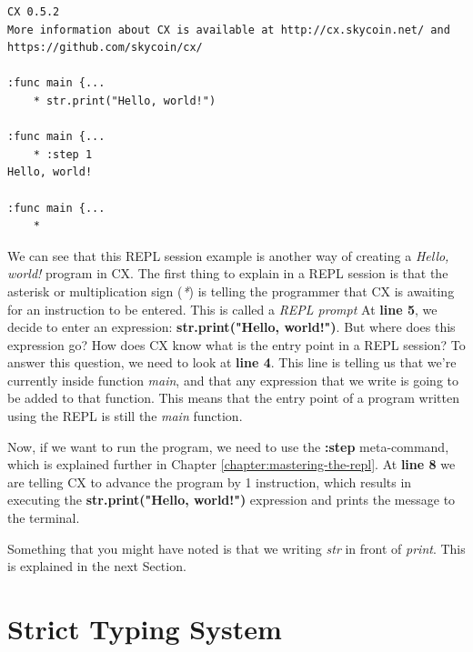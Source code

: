 \documentclass[11pt,fleqn,openany]{book} %
\begin{document}
\begin{lstlisting}[caption={REPL Session Example},captionpos=b,label={listing:repl-example-1}]
CX 0.5.2
More information about CX is available at http://cx.skycoin.net/ and https://github.com/skycoin/cx/

:func main {...
	* str.print("Hello, world!")

:func main {...
	* :step 1
Hello, world!

:func main {...
	* 
\end{lstlisting}

We can see that this REPL session example is another way of creating a \textit{Hello, world!} program in CX. The first thing to explain in a REPL session is that the asterisk or multiplication sign (\textit{*}) is telling the programmer that CX is awaiting for an instruction to be entered. This is called a \textit{REPL prompt} At \textbf{line 5}, we decide to enter an expression: \textbf{str.print("Hello, world!")}. But where does this expression go? How does CX know what is the entry point in a REPL session? To answer this question, we need to look at \textbf{line 4}. This line is telling us that we're currently inside function \emph{main}, and that any expression that we write is going to be added to that function. This means that the entry point of a program written using the REPL is still the \textit{main} function.

Now, if we want to run the program, we need to use the \textbf{:step} meta-command, which is explained further in Chapter \ref{chapter:mastering-the-repl}. At \textbf{line 8} we are telling CX to advance the program by 1 instruction, which results in executing the \textbf{str.print("Hello, world!")} expression and prints the message to the terminal.

Something that you might have noted is that we writing \textit{str} in front of \textit{print}. This is explained in the next Section.

\section{Strict Typing System}

\end{document}

